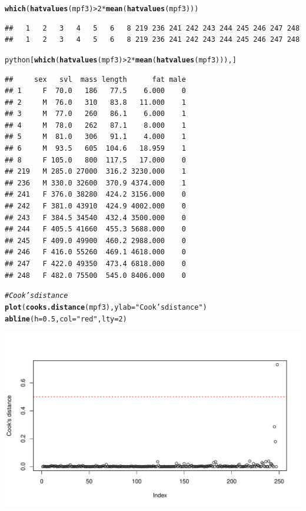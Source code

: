 \documentclass[oneside]{book}\usepackage[]{graphicx}\usepackage[dvipsnames,table,xcdraw]{xcolor}
\makeatletter
\def\maxwidth{ %
  \ifdim\Gin@nat@width>\linewidth
    \linewidth
  \else
    \Gin@nat@width
  \fi
}
\newcommand{\hlnum}[1]{\textcolor[rgb]{0.686,0.059,0.569}{#1}}%
\newcommand{\hlstr}[1]{\textcolor[rgb]{0.192,0.494,0.8}{#1}}%
\newcommand{\hlcom}[1]{\textcolor[rgb]{0.678,0.584,0.686}{\textit{#1}}}%
\newcommand{\hlopt}[1]{\textcolor[rgb]{0,0,0}{#1}}%
\newcommand{\hlstd}[1]{\textcolor[rgb]{0.345,0.345,0.345}{#1}}%
\newcommand{\hlkwc}[1]{\textcolor[rgb]{0.333,0.667,0.333}{#1}}%
\newcommand{\hlkwd}[1]{\textcolor[rgb]{0.737,0.353,0.396}{\textbf{#1}}}%
\newenvironment{kframe}{%
 \def\at@end@of@kframe{}%
 \ifinner\ifhmode%
  \def\at@end@of@kframe{\end{minipage}}%
  \begin{minipage}{\columnwidth}%
 \fi\fi%
 \def\FrameCommand##1{\hskip\@totalleftmargin \hskip-\fboxsep
 \colorbox{shadecolor}{##1}\hskip-\fboxsep
     \hskip-\linewidth \hskip-\@totalleftmargin \hskip\columnwidth}%
 \MakeFramed {\advance\hsize-\width
   \@totalleftmargin\z@ \linewidth\hsize
   \@setminipage}}%
 {\par\unskip\endMakeFramed%
 \at@end@of@kframe}
\newenvironment{knitrout}{}{} %
\makeatother
\begin{document}
\begin{knitrout}
\begin{kframe}\begin{alltt}
\hlkwd{which}\hlstd{(}\hlkwd{hatvalues}\hlstd{(mpf3)} \hlopt{>} \hlnum{2} \hlopt{*} \hlkwd{mean}\hlstd{(}\hlkwd{hatvalues}\hlstd{(mpf3)))}
\end{alltt}
\begin{verbatim}
##   1   2   3   4   5   6   8 219 236 241 242 243 244 245 246 247 248 
##   1   2   3   4   5   6   8 219 236 241 242 243 244 245 246 247 248
\end{verbatim}
\begin{alltt}
\hlstd{python[}\hlkwd{which}\hlstd{(}\hlkwd{hatvalues}\hlstd{(mpf3)} \hlopt{>} \hlnum{2} \hlopt{*} \hlkwd{mean}\hlstd{(}\hlkwd{hatvalues}\hlstd{(mpf3))), ]}
\end{alltt}
\begin{verbatim}
##     sex   svl  mass length      fat male
## 1     F  70.0   186   77.5    6.000    0
## 2     M  76.0   310   83.8   11.000    1
## 3     M  77.0   260   86.1    6.000    1
## 4     M  78.0   262   87.1    8.000    1
## 5     M  81.0   306   91.1    4.000    1
## 6     M  93.5   605  104.6   18.959    1
## 8     F 105.0   800  117.5   17.000    0
## 219   M 285.0 27000  316.2 3230.000    1
## 236   M 330.0 32600  370.9 4374.000    1
## 241   F 376.0 38280  424.2 3156.000    0
## 242   F 381.0 43910  424.9 4002.000    0
## 243   F 384.5 34540  432.4 3500.000    0
## 244   F 405.5 41660  455.3 5688.000    0
## 245   F 409.0 49900  460.2 2988.000    0
## 246   F 416.0 55260  469.1 4618.000    0
## 247   F 422.0 49350  473.4 6818.000    0
## 248   F 482.0 75500  545.0 8406.000    0
\end{verbatim}
\begin{alltt}
\hlcom{# Cook's distance}
\hlkwd{plot}\hlstd{(}\hlkwd{cooks.distance}\hlstd{(mpf3),} \hlkwc{ylab} \hlstd{=} \hlstr{"Cook's distance"}\hlstd{)}
\hlkwd{abline}\hlstd{(}\hlkwc{h} \hlstd{=} \hlnum{0.5}\hlstd{,} \hlkwc{col} \hlstd{=} \hlstr{"red"}\hlstd{,} \hlkwc{lty} \hlstd{=} \hlnum{2}\hlstd{)}
\end{alltt}
\end{kframe}

{\centering \includegraphics[width=\maxwidth]{figure/unnamed-chunk-58-4} 

}
\end{knitrout}
\end{document}
